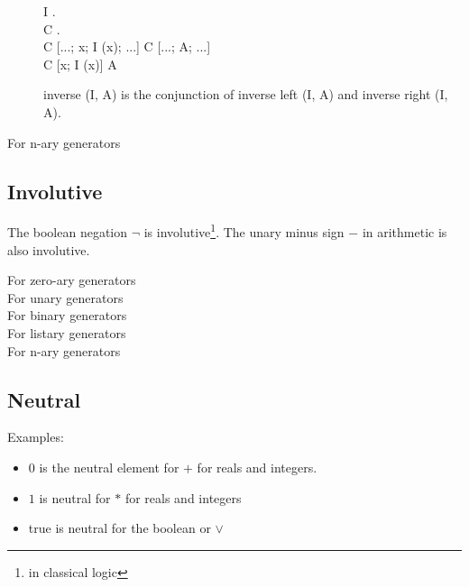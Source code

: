 \begin{description}
{ I . \\
  C . \\ 
    C [...; x; I (x); ...] \rw C [...; A; ...]  \\
            C [x; I (x)] \rw A
}

inverse (I, A) is the conjunction of inverse left (I, A) and inverse
right (I, A). 

\item[For n-ary generators] \na

\end{description}




\subsection{Involutive}
\label{sec:involutive}
The boolean negation $\neg$  is involutive\footnote{in classical logic}.
The unary minus sign $-$ in arithmetic is also involutive.

\begin{description}

\item[For zero-ary generators] \na
\item[For unary generators] 
\item[For binary generators] \na
\item[For listary generators] \na
\item[For n-ary generators] \na

\end{description}








\subsection{Neutral}
\label{sec:neutral}

Examples:
\begin{itemize}
\item $0$ is the neutral element for $+$ for reals and integers.
\item $1$ is neutral for $*$ for reals and integers
\item true is neutral for the boolean or $\vee$
\end{itemize}

